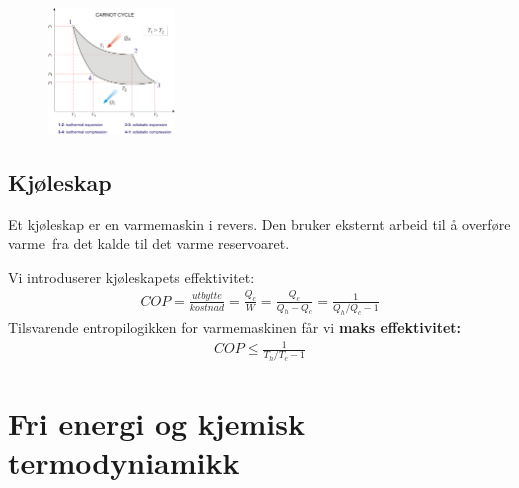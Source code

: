 \documentclass[10pt,a4paper]{article}
\renewcommand{\b}{\textbf}
\begin{document}
\begin{multicols}{2}
\begin{figure}[H]
\centering
	\includegraphics[width=0.3\textwidth]{figures/carnot_cycle.png}
\end{figure}

\subsection*{Kjøleskap}
\begin{framed}
Et kjøleskap er en varmemaskin i revers. Den bruker eksternt arbeid til å overføre varme fra det kalde til det varme reservoaret.

Vi introduserer kjøleskapets effektivitet:
\begin{align*}
	COP = \frac{utbytte}{kostnad} = \frac{Q_c}{W} = \frac{Q_c}{Q_h-Q_c} = \frac{1}{Q_h/Q_c - 1}
\end{align*}
Tilsvarende entropilogikken for varmemaskinen får vi \b{maks effektivitet:}
\begin{align*}
	COP \leq \frac{1}{T_h/T_c - 1}
\end{align*}
\end{framed}




\section{Fri energi og kjemisk termodyniamikk}

\end{multicols}
\end{document}
